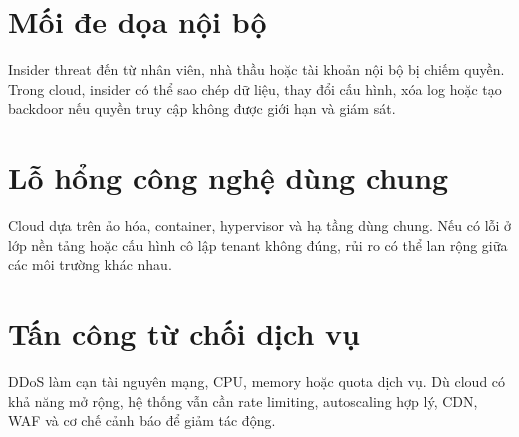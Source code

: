 \section{Mối đe dọa nội bộ}
Insider threat đến từ nhân viên, nhà thầu hoặc tài khoản nội bộ bị chiếm quyền. Trong cloud, insider có thể sao chép dữ liệu, thay đổi cấu hình, xóa log hoặc tạo backdoor nếu quyền truy cập không được giới hạn và giám sát.

\section{Lỗ hổng công nghệ dùng chung}
Cloud dựa trên ảo hóa, container, hypervisor và hạ tầng dùng chung. Nếu có lỗi ở lớp nền tảng hoặc cấu hình cô lập tenant không đúng, rủi ro có thể lan rộng giữa các môi trường khác nhau.

\section{Tấn công từ chối dịch vụ}
DDoS làm cạn tài nguyên mạng, CPU, memory hoặc quota dịch vụ. Dù cloud có khả năng mở rộng, hệ thống vẫn cần rate limiting, autoscaling hợp lý, CDN, WAF và cơ chế cảnh báo để giảm tác động.

